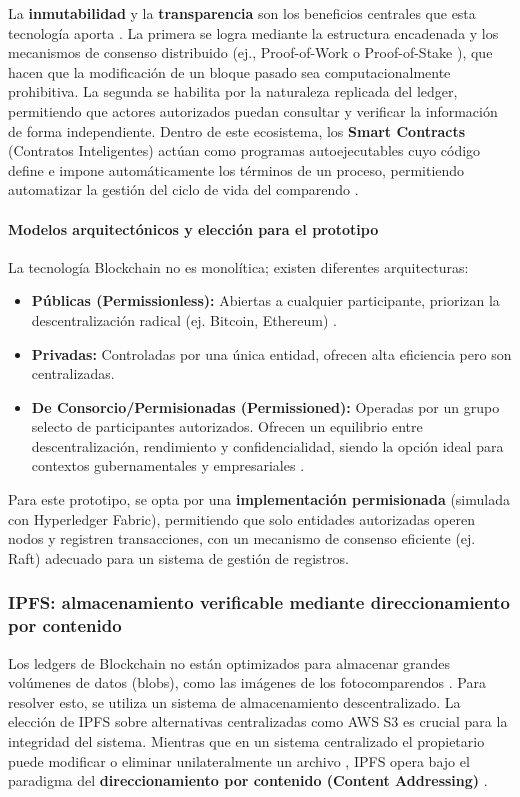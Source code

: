 La \textbf{inmutabilidad} y la \textbf{transparencia} son los beneficios centrales que esta tecnología aporta \parencite{swan2015blockchain,antonopoulos2023mastering}. La primera se logra mediante la estructura encadenada y los mecanismos de consenso distribuido (ej., Proof-of-Work \parencite{nakamoto2008bitcoin} o Proof-of-Stake \parencite{king2012ppcoin}), que hacen que la modificación de un bloque pasado sea computacionalmente prohibitiva. La segunda se habilita por la naturaleza replicada del ledger, permitiendo que actores autorizados puedan consultar y verificar la información de forma independiente. Dentro de este ecosistema, los \textbf{Smart Contracts} (Contratos Inteligentes) actúan como programas autoejecutables cuyo código define e impone automáticamente los términos de un proceso, permitiendo automatizar la gestión del ciclo de vida del comparendo \parencite{szabo1997smart, wood2014ethereum, buterin2014next}.

\paragraph{Modelos arquitectónicos y elección para el prototipo}
La tecnología Blockchain no es monolítica; existen diferentes arquitecturas:
\begin{itemize}
    \item \textbf{Públicas (Permissionless):} Abiertas a cualquier participante, priorizan la descentralización radical (ej. Bitcoin, Ethereum) \parencite{nakamoto2008bitcoin}.
    \item \textbf{Privadas:} Controladas por una única entidad, ofrecen alta eficiencia pero son centralizadas.
    \item \textbf{De Consorcio/Permisionadas (Permissioned):} Operadas por un grupo selecto de participantes autorizados. Ofrecen un equilibrio entre descentralización, rendimiento y confidencialidad, siendo la opción ideal para contextos gubernamentales y empresariales \parencite{vukolic2015quest,cachin2018architecture}.
\end{itemize}
Para este prototipo, se opta por una \textbf{implementación permisionada} (simulada con Hyperledger Fabric), permitiendo que solo entidades autorizadas operen nodos y registren transacciones, con un mecanismo de consenso eficiente (ej. Raft) adecuado para un sistema de gestión de registros.

\subsubsection{IPFS: almacenamiento verificable mediante direccionamiento por contenido}
Los ledgers de Blockchain no están optimizados para almacenar grandes volúmenes de datos (blobs), como las imágenes de los fotocomparendos \parencite{xu2019taxonomy}. Para resolver esto, se utiliza un sistema de almacenamiento descentralizado. La elección de IPFS sobre alternativas centralizadas como AWS S3 es crucial para la integridad del sistema. Mientras que en un sistema centralizado el propietario puede modificar o eliminar unilateralmente un archivo \parencite{vogels2008eventually}, IPFS opera bajo el paradigma del \textbf{direccionamiento por contenido (Content Addressing)} \parencite{benet2014ipfs, voigt2017gdpr}.

